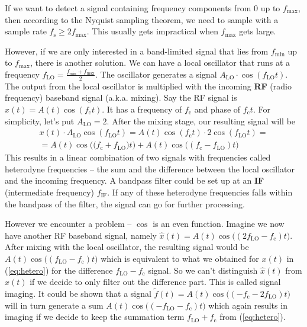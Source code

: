 \documentclass[a4paper,12pt,twoside,openright]{report}
\begin{document}
If we want to detect a signal containing frequency components from $0$ up to $f_\text{max}$, then according to the Nyquist sampling theorem, we need to sample with a sample rate $f_\text{s} \geq 2 f_\text{max}$. This usually gets impractical when $f_\text{max}$ gets large.

However, if we are only interested in a band-limited signal that lies from $f_\text{min}$ up to $f_\text{max}$, there is another solution. We can have a local oscillator that runs at a frequency $f_\text{LO} = \frac{f_\text{min}+f_\text{max}}{2}$. The oscillator generates a signal $A_\text{LO} \cdot \cos(f_\text{LO} t)$. The output from the local oscillator is multiplied with the incoming \textbf{RF} (radio frequency) baseband signal (a.k.a. mixing). Say the RF signal is $x(t) = A(t) \cos(f_\text{c} t)$. It has a frequency of $f_\text{c}$ and phase of $f_\text{c} t$. For simplicity, let's put $A_\text{LO} = 2$. After the mixing stage, our resulting signal will be
\begin{multline}
\label{eq:hetero}
x(t) \cdot A_\text{LO} \cos(f_\text{LO} t) =  A(t) \cos(f_\text{c} t) \cdot 2 \cos(f_\text{LO} t) = \\
=  A(t) \cos\big( (f_\text{c} + f_\text{LO} \big) t\big) + A(t) \cos\big( (f_\text{c} - f_\text{LO}) t \big)
\end{multline}
This results in a linear combination of two signals with frequencies called heterodyne frequencies -- the sum and the difference between the local oscillator and the incoming frequency. A bandpass filter could be set up at an \textbf{IF} (intermediate frequency) $f_\text{IF}$. If any of these heterodyne frequencies falls within the bandpass of the filter, the signal can go for further processing.

However we encounter a problem -- $\cos$ is an even function. Imagine we now have another RF baseband signal, namely $\hat{x}(t) = A(t) \cos\big( (2 f_\text{LO} - f_\text{c}) t\big)$. After mixing with the local oscillator, the resulting signal would be $A(t) \cos\big( (f_\text{LO} - f_\text{c}) t \big)$ which is equivalent to what we obtained for $x(t)$ in (\ref{eq:hetero}) for the difference $f_\text{LO} - f_\text{c}$ signal. So we can't distinguish $\hat{x}(t)$ from $x(t)$ if we decide to only filter out the difference part. This is called signal imaging. It could be shown that a signal $\tilde{f}(t) = A(t) \cos\big( (- f_\text{c} - 2 f_\text{LO}) t\big)$ will in turn generate a sum $A(t) \cos\big( ( - f_\text{LO} - f_\text{c}) t \big)$ which again results in imaging if we decide to keep the summation term $f_\text{LO} + f_\text{c}$ from (\ref{eq:hetero}).
\end{document}

